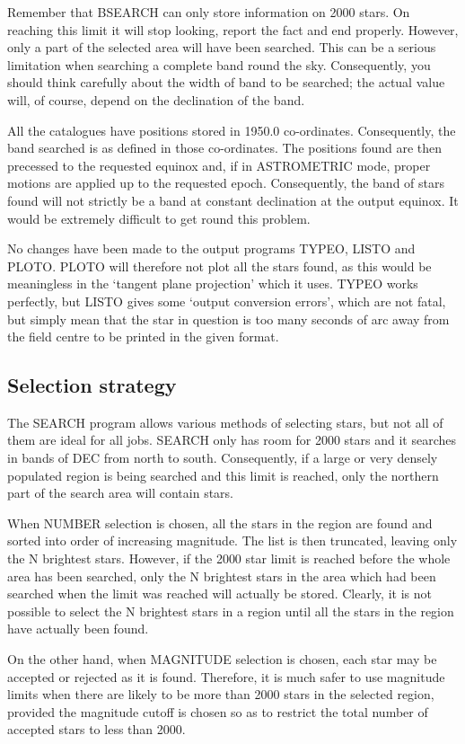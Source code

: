 \documentclass{article}
\begin{document}
Remember that BSEARCH can only store information on 2000 stars.
On reaching this limit it will stop looking, report the fact and end properly.
However, only a part of the selected area will have been searched.
This can be a serious limitation when searching a complete band round the sky.
Consequently, you should think carefully about the width of band to be searched;
the actual value will, of course, depend on the declination of the band.

All the catalogues have positions stored in 1950.0 co-ordinates.
Consequently, the band searched is as defined in those co-ordinates.
The positions found are then precessed to the requested equinox and, if in
ASTROMETRIC mode, proper motions are applied up to the requested epoch.
Consequently, the band of stars found will not strictly be a band at constant
declination at the output equinox.
It would be extremely difficult to get round this problem.

No changes have been made to the output programs TYPEO, LISTO and PLOTO.
PLOTO will therefore not plot all the stars found, as this would be meaningless
in the `tangent plane projection' which it uses.
TYPEO works perfectly, but LISTO gives some `output conversion errors', which
are not fatal, but simply mean that the star in question is too many seconds of
arc away from the field centre to be printed in the given format.
\subsection{Selection strategy}
The SEARCH program allows various methods of selecting stars, but not all of
them are ideal for all jobs.
SEARCH only has room for 2000 stars and it searches in bands of DEC from north
to south.
Consequently, if a large or very densely populated region is being searched and
this limit is reached, only the northern part of the search area will contain
stars.

When NUMBER selection is chosen, all the stars in the region are found and
sorted into order of increasing magnitude.
The list is then truncated, leaving only the N brightest stars.
However, if the 2000 star limit is reached before the whole area has been
searched, only the N brightest stars in the area which had been searched when
the limit was reached will actually be stored.
Clearly, it is not possible to select the N brightest stars in a region until
all the stars in the region have actually been found.

On the other hand, when MAGNITUDE selection is chosen, each star may be
accepted or rejected as it is found.
Therefore, it is much safer to use magnitude limits when there are likely to be
more than 2000 stars in the selected region, provided the magnitude cutoff is
chosen so as to restrict the total number of accepted stars to less than 2000.
\end{document}
